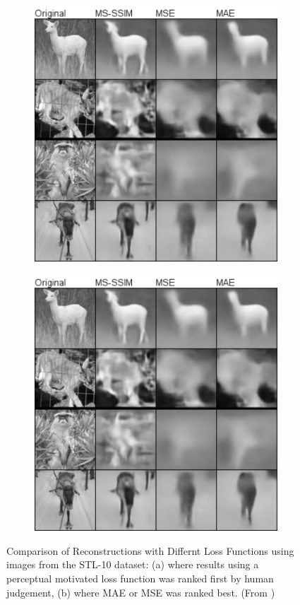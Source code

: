 \begin{figure}[htpb]
\centering
\begin{subfigure}{0.4\textwidth}
  \centering
  \includegraphics[width=.8\linewidth]{figures/img-loss-comp1.png}
  \caption{}
  \label{fig:percept-vs-lp1}
\end{subfigure}%
\begin{subfigure}{0.4\textwidth}
  \centering
  \includegraphics[width=.8\linewidth]{figures/img-loss-comp1.png}
  \caption{}
  \label{fig:percept-vs-lp1}
\end{subfigure}
\caption[Comparison of Reconstructions with Differnt Loss Functions]{Comparison of Reconstructions with Differnt Loss Functions using images from the STL-10 dataset: (a) where results using a perceptual motivated loss function was ranked first by human judgement, (b) where MAE or MSE was ranked best. (From \parencite{learning-perc-sim})}
\label{fig:percept-vs-lp}
\end{figure}


